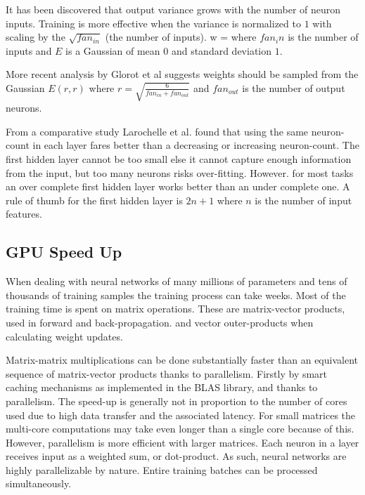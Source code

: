 It has been discovered that output variance grows with the number of neuron inputs.
Training is more effective when the variance is normalized to $1$  with scaling by the $\sqrt{fan_{in}}$ (the number of inputs)\citep{neuralnetworkinitialization}.
\be
w = 
\ee
where $fan_in$ is the number of inputs and $E$ is a Gaussian of mean $0$ and standard deviation $1$.

More recent analysis by Glorot et al\citep{glorot2010understanding} suggests weights should be sampled from the Gaussian $E(r,r)$
where $r = \sqrt{\frac{6}{fan_{in} + fan_{out}}}$ and $fan_{out}$ is the number of output neurons.

From a comparative study Larochelle et al. found that using the same neuron-count in each layer fares better than a decreasing or increasing neuron-count.
The first hidden layer cannot be too small else it cannot capture enough information from the input, but too many neurons risks over-fitting.
However. for most tasks an over complete first hidden layer works better than an under complete one.
A rule of thumb for the first hidden layer is $2n + 1$ where $n$ is the number of input features.

\subsection{GPU Speed Up}

When dealing with neural networks of many millions of parameters and tens of thousands of training samples the training process can take weeks.
Most of the training time is spent on matrix operations.
These are matrix-vector products, used in forward and back-propagation. and vector outer-products when calculating weight updates.

Matrix-matrix multiplications can be done substantially faster than an equivalent sequence of matrix-vector products thanks to parallelism.
Firstly by smart caching mechanisms as implemented in the BLAS library, and thanks to parallelism\citep{wang2013augem}.
The speed-up is generally not in proportion to the number of cores used due to high data transfer and the associated latency\citep{ciresan2012multi}.
For small matrices the multi-core computations may take even longer than a single core because of this.
However, parallelism is more efficient with larger matrices.
Each neuron in a layer receives input as a weighted sum, or dot-product.
As such, neural networks are highly parallelizable by nature.
Entire training batches can be processed simultaneously.


